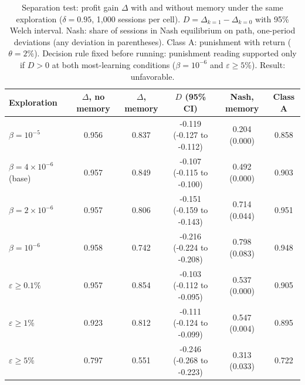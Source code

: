 \begin{table}[t]
\centering\small
\caption{Separation test: profit gain $\Delta$ with and without memory under the same exploration ($\delta = 0.95$, 1{,}000 sessions per cell). $D = \Delta_{k=1} - \Delta_{k=0}$ with 95\% Welch interval. Nash: share of sessions in Nash equilibrium on path, one-period deviations (any deviation in parentheses). Class A: punishment with return ($\theta = 2\%$). Decision rule fixed before running: punishment reading supported only if $D > 0$ at both most-learning conditions ($\beta = 10^{-6}$ and $\varepsilon \geq 5\%$). Result: unfavorable.}
\label{tab:separation}
\begin{tabular}{lccccc}
\toprule
Exploration & $\Delta$, no memory & $\Delta$, memory & $D$ (95\% CI) & Nash, memory & Class A \\
\midrule
$\beta = 10^{-5}$ & 0.956 & 0.837 & -0.119 (-0.127 to -0.112) & 0.204 (0.000) & 0.858 \\
$\beta = 4\times10^{-6}$ (base) & 0.957 & 0.849 & -0.107 (-0.115 to -0.100) & 0.492 (0.000) & 0.903 \\
$\beta = 2\times10^{-6}$ & 0.957 & 0.806 & -0.151 (-0.159 to -0.143) & 0.714 (0.044) & 0.951 \\
$\beta = 10^{-6}$ & 0.958 & 0.742 & -0.216 (-0.224 to -0.208) & 0.798 (0.083) & 0.948 \\
\midrule
$\varepsilon \geq 0.1\%$ & 0.957 & 0.854 & -0.103 (-0.112 to -0.095) & 0.537 (0.000) & 0.905 \\
$\varepsilon \geq 1\%$ & 0.923 & 0.812 & -0.111 (-0.124 to -0.099) & 0.547 (0.004) & 0.895 \\
$\varepsilon \geq 5\%$ & 0.797 & 0.551 & -0.246 (-0.268 to -0.223) & 0.313 (0.033) & 0.722 \\
\bottomrule
\end{tabular}
\end{table}
